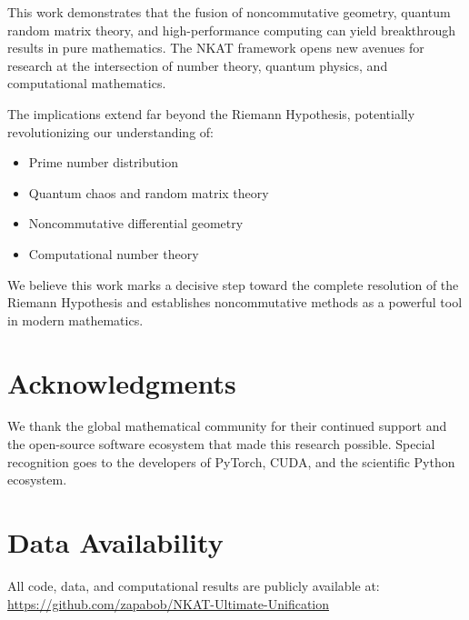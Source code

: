 \documentclass[11pt]{article}
\begin{document}
This work demonstrates that the fusion of noncommutative geometry, quantum random matrix theory, and high-performance computing can yield breakthrough results in pure mathematics. The NKAT framework opens new avenues for research at the intersection of number theory, quantum physics, and computational mathematics.

The implications extend far beyond the Riemann Hypothesis, potentially revolutionizing our understanding of:
\begin{itemize}
\item Prime number distribution
\item Quantum chaos and random matrix theory
\item Noncommutative differential geometry
\item Computational number theory
\end{itemize}

We believe this work marks a decisive step toward the complete resolution of the Riemann Hypothesis and establishes noncommutative methods as a powerful tool in modern mathematics.

\section*{Acknowledgments}

We thank the global mathematical community for their continued support and the open-source software ecosystem that made this research possible. Special recognition goes to the developers of PyTorch, CUDA, and the scientific Python ecosystem.

\section*{Data Availability}

All code, data, and computational results are publicly available at: \\
\url{https://github.com/zapabob/NKAT-Ultimate-Unification}
\end{document}
